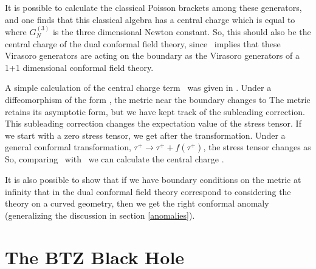 It is possible to calculate the classical Poisson brackets 
among these generators, and one finds that 
this classical algebra has a central
charge which is equal to \cite{Brown:1986nw}
where $G_N^{(3)}$ is the three dimensional Newton constant. 
So, this should also be the central charge of the dual conformal
field theory, since \asymp\ implies that
these Virasoro generators are acting on the boundary
as the Virasoro generators of a 1+1 dimensional conformal field 
theory. 

A simple calculation of the central charge term \brown\ 
was given in \cite{Balasubramanian:1999re}.
Under a diffeomorphism of the form \asymp, 
the metric near the boundary changes to 
The metric retains its asymptotic form, but we have kept track of the
subleading correction. This subleading correction changes the 
expectation value of the stress tensor. If we start with 
a zero stress tensor, we get 
after the transformation.
Under a general conformal transformation, $ \tau^+ \to \tau^+ + f(\tau^+)$,
the stress tensor changes 
as 
So, comparing \chstress\ with \newexcp\ we can calculate the central
charge \brown .


It is also possible to show that if we have boundary 
conditions on the metric at infinity that  in the dual 
conformal field theory correspond to considering the theory on a 
curved geometry, then we get the right conformal anomaly 
\cite{Henningson:1998gx} (generalizing the discussion in section 
\ref{anomalies}). 

\section{The BTZ Black Hole}

